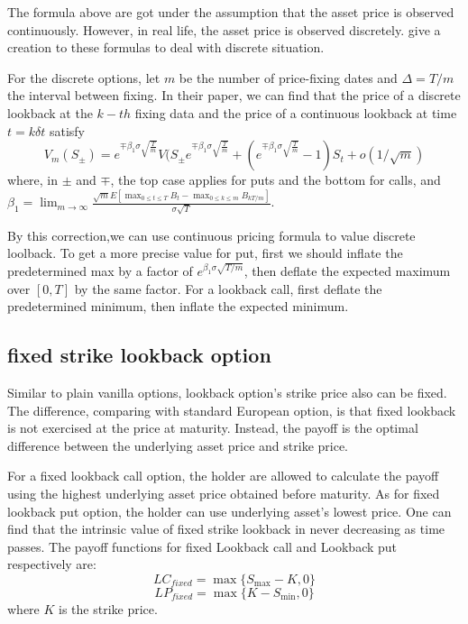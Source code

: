 \documentclass[11pt]{book}
\begin{document}
The formula above are got under the assumption that the asset price is observed continuously. However, in real life, the asset price is observed discretely. \cite{Broadie1999} give a creation to these formulas to deal with discrete situation.

For the discrete options, let $m$ be the number of price-fixing dates and $\Delta = T/m$ the interval between fixing. In their paper, we can find that the price of a discrete lookback at the $k-th$ fixing data and the price of a continuous lookback at time $t = k \delta t$ satisfy
\begin{equation}\label{eq:7}
V_m (S_\pm)
=
e^{\mp\beta_1 \sigma \sqrt{\frac{T}{m}}}
V(S_{\pm}e^{\mp\beta _1 \sigma \sqrt{\frac{T}{m}}} +
(e^{\mp \beta_1 \sigma \sqrt{\frac{T}{m}}} -1)S_t + o(1/\sqrt{m})
\end{equation}
where, in $\pm$ and $\mp$, the top case applies for puts and the bottom for calls, and $\beta_1 = \lim_{m\to\infty} \frac{\sqrt{m}E[\max_{0\leq t \leq T} B_t - \max_{0\leq k \leq m} B_{kT/m}]}{\sigma \sqrt{T}}$.

By this correction,we can use continuous pricing formula
to value discrete loolback. To get a more precise value for put,
first we should inflate the predetermined max by a factor of
$e^{\beta_1 \sigma \sqrt{T/m}}$,
then deflate the expected maximum over $[0,T]$ by the same factor. For a lookback call, first deflate the predetermined minimum, then inflate the expected minimum.




\subsection{fixed strike lookback option}
Similar to plain vanilla options, lookback option's strike price also can be fixed. The difference, comparing with standard European option, is that fixed lookback is not exercised at the price at maturity.  Instead, the payoff is the optimal difference between the underlying asset price and strike price. 

For a fixed lookback call option, the holder are allowed to calculate the payoff using the highest underlying asset price obtained before maturity. As for fixed lookback put option, the holder can use underlying asset's lowest price. One can find that the intrinsic value of fixed strike lookback in never decreasing as time passes. The payoff functions for fixed Lookback call and  Lookback put respectively are:
\begin{equation}
LC_{fixed} = \max\{S_{\max} - K, 0\} 
\end{equation}
\begin{equation}
LP_{fixed}= \max\{K-S_{\min},0\}
\end{equation}
where $K$ is the strike price.
\end{document}
